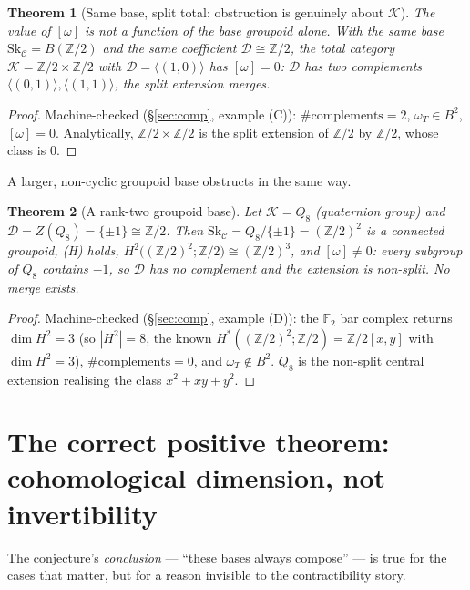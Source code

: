 \documentclass[11pt]{article}
\newtheorem{theorem}{Theorem}
\theoremstyle{definition}
\newcommand{\C}{\mathcal{C}}
\newcommand{\D}{\mathcal{D}}
\newcommand{\K}{\mathcal{K}}
\newcommand{\Sk}{\mathrm{Sk}}
\newcommand{\Z}{\mathbb{Z}}
\begin{document}
\begin{theorem}[Same base, split total: obstruction is genuinely about $\K$]\label{thm:contrast}
The value of $[\omega]$ is not a function of the base groupoid alone. With the same
base $\Sk_\C=B(\Z/2)$ and the same coefficient $\D\cong\Z/2$, the total category
$\K=\Z/2\times\Z/2$ with $\D=\langle(1,0)\rangle$ has $[\omega]=0$: $\D$ has two
complements $\langle(0,1)\rangle,\langle(1,1)\rangle$, the split extension merges.
\end{theorem}
\begin{proof}
Machine-checked (\S\ref{sec:comp}, example (C)): $\#\text{complements}=2$,
$\omega_T\in B^2$, $[\omega]=0$. Analytically, $\Z/2\times\Z/2$ is the split
extension of $\Z/2$ by $\Z/2$, whose class is $0$.
\end{proof}

A larger, non-cyclic groupoid base obstructs in the same way.

\begin{theorem}[A rank-two groupoid base]\label{thm:q8}
Let $\K=Q_8$ (quaternion group) and $\D=Z(Q_8)=\{\pm1\}\cong\Z/2$. Then
$\Sk_\C=Q_8/\{\pm1\}=(\Z/2)^2$ is a connected groupoid, \textnormal{(H)} holds,
$H^2\big((\Z/2)^2;\Z/2\big)\cong(\Z/2)^3$, and $[\omega]\neq0$: every subgroup of
$Q_8$ contains $-1$, so $\D$ has no complement and the extension is non-split. No
merge exists.
\end{theorem}
\begin{proof}
Machine-checked (\S\ref{sec:comp}, example (D)): the $\mathbb F_2$ bar complex
returns $\dim H^2=3$ (so $|H^2|=8$, the known $H^*((\Z/2)^2;\Z/2)=\Z/2[x,y]$ with
$\dim H^2=3$), $\#\text{complements}=0$, and $\omega_T\notin B^2$. $Q_8$ is the
non-split central extension realising the class $x^2+xy+y^2$.
\end{proof}

\section{The correct positive theorem: cohomological dimension, not invertibility}
\label{sec:positive}

The conjecture's \emph{conclusion} --- ``these bases always compose'' --- is true
for the cases that matter, but for a reason invisible to the contractibility story.
\end{document}

